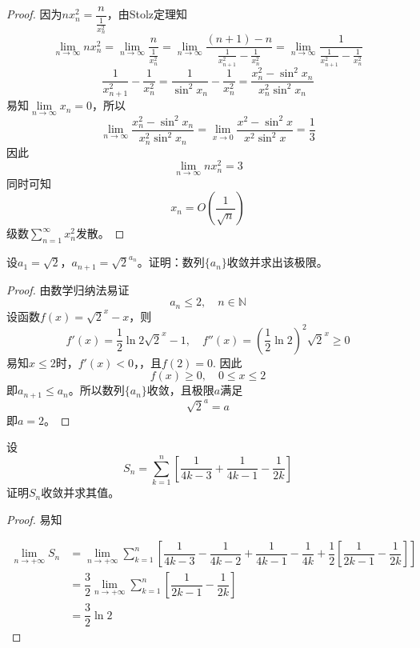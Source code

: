 \begin{proof}

    因为$nx_n^2 = \dfrac{n}{\frac{1}{x_n^2}}$，由\textup{Stolz}定理知
    $$\lim\limits_{n \to\infty}{nx_n^2} = \lim\limits_{n\to\infty}{\dfrac{n}{\frac{1}{x_n^2}}} = \lim\limits_{n \to \infty}{\dfrac{(n + 1) - n}{\frac{1}{x_{n + 1}^2} - \frac{1}{x_n^2}}} = \lim\limits_{n \to \infty}{\dfrac{1}{\frac{1}{x_{n + 1}^2} - \frac{1}{x_n^2}}}$$
    $$\dfrac{1}{x_{n + 1}^2} - \dfrac{1}{x_n^2} = \dfrac{1}{\sin^2{x_n}} - \dfrac{1}{x_n^2} = \dfrac{x_n^2 - \sin^2{x_n}}{x_n^2 \sin^2{x_n}}$$
    易知$\lim\limits_{n\to\infty}{x_n} = 0$，所以
    $$\lim\limits_{n \to \infty}{\dfrac{x_n^2 - \sin^2{x_n}}{x_n^2 \sin^2{x_n}}} = \lim\limits_{x \to 0}{\dfrac{x^2 - \sin^2{x}}{x^2 \sin^2{x}}} = \dfrac{1}{3}$$
    因此
    $$\lim\limits_{n \to\infty}{nx_n^2} = 3$$
    同时可知
    $$x_n = O\left( \dfrac{1}{\sqrt{n}} \right)$$
    级数$\sum\limits_{n = 1}^{\infty}{x_n^2}$发散。

\end{proof}

\begin{proposition}

    设$a_1 = \sqrt{2}$，$a_{n + 1} = {\sqrt{2}}^{a_n}$。证明：数列$\{a_n\}$收敛并求出该极限。

\end{proposition}

\begin{proof}

    由数学归纳法易证
    $$a_n \leq 2, \quad n \in \mathbb{N}$$
    设函数$f(x) = {\sqrt{2}}^x - x$，则
    $$f'(x) = \dfrac{1}{2}\ln2 {\sqrt{2}}^x - 1, \quad f''(x) = \left(\dfrac{1}{2}\ln 2 \right)^2 {\sqrt{2}}^x \geq 0$$
    易知$x \leq 2$时，$f'(x) < 0$，，且$f(2) = 0$. 因此
    $$f(x) \geq 0, \quad 0 \leq x \leq 2$$
    即$a_{n + 1} \leq a_n$。所以数列$\{a_n\}$收敛，且极限$a$满足
    $${\sqrt{2}}^{a} = a$$
    即$a = 2$。

\end{proof}

\begin{proposition}

    设$$S_{n} = \sum\limits_{k =1}^{n} \left[ \dfrac{1}{4k-3} + \dfrac{1}{4k - 1} - \dfrac{1}{2k} \right]$$
    证明$S_{n}$收敛并求其值。

\end{proposition}

\begin{proof}

    易知
    
    \begin{align*}
        \lim\limits_{n \to +\infty } S_{n} & =  \lim\limits_{n\to +\infty} \sum\limits_{k = 1}^{n} \left[   \dfrac{1}{4k-3} - \dfrac{1}{4k-2} +  \dfrac{1}{4k-1} - \dfrac{1}{4k}  + \dfrac{1}{2} \left[  \dfrac{1}{2k-1} -\dfrac{1}{2k} \right]      \right] \\
        & = \dfrac{3}{2} \lim\limits_{n \to + \infty} \sum\limits_{k = 1}^{n}  \left[  \dfrac{1}{2k-1} -\dfrac{1}{2k} \right] \\
        & = \dfrac{3}{2} \ln 2
    \end{align*}

\end{proof}

